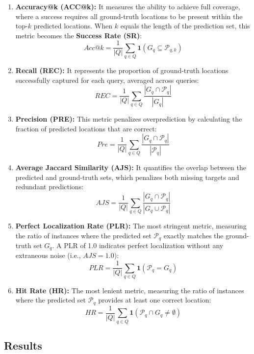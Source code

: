 \begin{enumerate}[leftmargin=*, label=\textbf{(\arabic*)}]
    \item \textbf{Accuracy@k (ACC@k):} It measures the ability to achieve full coverage, where a success requires all ground-truth locations to be present within the top-$k$ predicted locations. When $k$ equals the length of the prediction set, this metric becomes the \textbf{Success Rate (SR)}:
    \begin{equation}
        Acc@k = \frac{1}{|Q|} \sum_{q \in Q} \mathbf{1}(G_q \subseteq \mathcal{P}_{q,k})
    \end{equation}

    \item \textbf{Recall (REC):} It represents the proportion of ground-truth locations successfully captured for each query, averaged across queries:
    \begin{equation}
        REC = \frac{1}{|Q|} \sum_{q \in Q} \frac{|G_q \cap \mathcal{P}_q|}{|G_q|}
    \end{equation}

    \item \textbf{Precision (PRE):} This metric penalizes overprediction by calculating the fraction of predicted locations that are correct:
    \begin{equation}
        Pre = \frac{1}{|Q|} \sum_{q \in Q} \frac{|G_q \cap \mathcal{P}_q|}{|\mathcal{P}_q|}
    \end{equation}

    \item \textbf{Average Jaccard Similarity (AJS):} It quantifies the overlap between the predicted and ground-truth sets, which penalizes both missing targets and redundant predictions:
    \begin{equation}
        AJS = \frac{1}{|Q|} \sum_{q \in Q} \frac{|G_q \cap \mathcal{P}_q|}{|G_q \cup \mathcal{P}_q|}
    \end{equation}

    \item \textbf{Perfect Localization Rate (PLR):} The most stringent metric, measuring the ratio of instances where the predicted set $\mathcal{P}_q$ exactly matches the ground-truth set $G_q$. A PLR of 1.0 indicates perfect localization without any extraneous noise (i.e., $AJS = 1.0$):
    \begin{equation}
        PLR = \frac{1}{|Q|} \sum_{q \in Q} \mathbf{1}(\mathcal{P}_q = G_q)
    \end{equation}

    \item \textbf{Hit Rate (HR):} The most lenient metric, measuring the ratio of instances where the predicted set $\mathcal{P}_q$ provides at least one correct location:
    \begin{equation}
        HR = \frac{1}{|Q|} \sum_{q \in Q} \mathbf{1}(\mathcal{P}_{q} \cap G_q \neq \emptyset)
    \end{equation}
\end{enumerate}

\subsection{Results}





